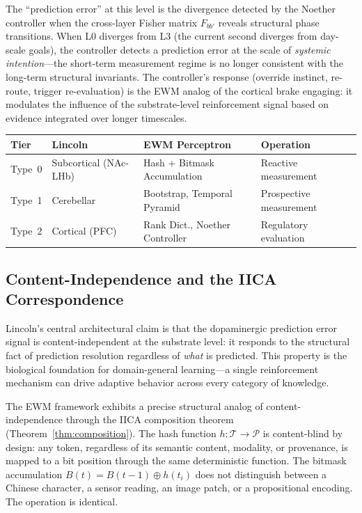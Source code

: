 \documentclass[11pt,a4paper]{article}
\theoremstyle{remark}
\begin{document}
The ``prediction error'' at this level is the divergence detected by the
Noether controller when the cross-layer Fisher matrix $F_{bb'}$ reveals
structural phase transitions. When L0 diverges from L3 (the current second
diverges from day-scale goals), the controller detects a prediction error at the
scale of \textit{systemic intention}---the short-term measurement regime is no
longer consistent with the long-term structural invariants. The controller's
response (override instinct, re-route, trigger re-evaluation) is the EWM analog
of the cortical brake engaging: it modulates the influence of the substrate-level
reinforcement signal based on evidence integrated over longer timescales.

\begin{center}
\begin{tabular}{@{}llll@{}}
\toprule
\textbf{Tier} & \textbf{Lincoln} & \textbf{EWM Perceptron} & \textbf{Operation} \\
\midrule
Type~0 & Subcortical (NAc-LHb)  & Hash + Bitmask Accumulation & Reactive measurement \\
Type~1 & Cerebellar             & Bootstrap, Temporal Pyramid & Prospective measurement \\
Type~2 & Cortical (PFC)         & Rank Dict., Noether Controller & Regulatory evaluation \\
\bottomrule
\end{tabular}
\end{center}

\subsection{Content-Independence and the IICA Correspondence}
\label{sec:content-independence}

Lincoln's central architectural claim is that the dopaminergic prediction error
signal is content-independent at the substrate level: it responds to the
structural fact of prediction resolution regardless of \textit{what} is
predicted. This property is the biological foundation for domain-general
learning---a single reinforcement mechanism can drive adaptive behavior across
every category of knowledge.

The EWM framework exhibits a precise structural analog of content-independence
through the IICA composition theorem (Theorem~\ref{thm:composition}). The hash
function $h: \mathcal{T} \to \mathcal{P}$ is content-blind by design: any
token, regardless of its semantic content, modality, or provenance, is mapped to
a bit position through the same deterministic function. The bitmask
accumulation $B(t) = B(t-1) \oplus h(t_i)$ does not distinguish between a
Chinese character, a sensor reading, an image patch, or a propositional
encoding. The operation is identical.
\end{document}
